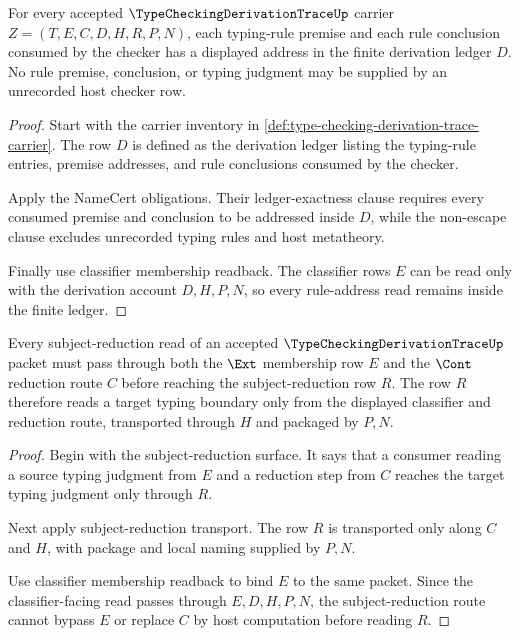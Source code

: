 \begin{theorem}
\label{thm:type-checking-derivation-trace-rule-address-totality}
For every accepted $\TypeCheckingDerivationTraceUp$ carrier $Z=(T,E,C,D,H,R,P,N)$, each typing-rule premise and each rule conclusion consumed by the checker has a displayed address in the finite derivation ledger $D$. No rule premise, conclusion, or typing judgment may be supplied by an unrecorded host checker row.
\end{theorem}
\begin{proof}
Start with the carrier inventory in \autoref{def:type-checking-derivation-trace-carrier}. The row $D$ is defined as the derivation ledger listing the typing-rule entries, premise addresses, and rule conclusions consumed by the checker.

Apply the NameCert obligations. Their ledger-exactness clause requires every consumed premise and conclusion to be addressed inside $D$, while the non-escape clause excludes unrecorded typing rules and host metatheory.

Finally use classifier membership readback. The classifier rows $E$ can be read only with the derivation account $D,H,P,N$, so every rule-address read remains inside the finite ledger.
\end{proof}

\begin{theorem}
\label{thm:type-checking-derivation-trace-ext-cont-route-coherence}
Every subject-reduction read of an accepted $\TypeCheckingDerivationTraceUp$ packet must pass through both the $\Ext$ membership row $E$ and the $\Cont$ reduction route $C$ before reaching the subject-reduction row $R$. The row $R$ therefore reads a target typing boundary only from the displayed classifier and reduction route, transported through $H$ and packaged by $P,N$.
\end{theorem}
\begin{proof}
Begin with the subject-reduction surface. It says that a consumer reading a source typing judgment from $E$ and a reduction step from $C$ reaches the target typing judgment only through $R$.

Next apply subject-reduction transport. The row $R$ is transported only along $C$ and $H$, with package and local naming supplied by $P,N$.

Use classifier membership readback to bind $E$ to the same packet. Since the classifier-facing read passes through $E,D,H,P,N$, the subject-reduction route cannot bypass $E$ or replace $C$ by host computation before reading $R$.
\end{proof}


